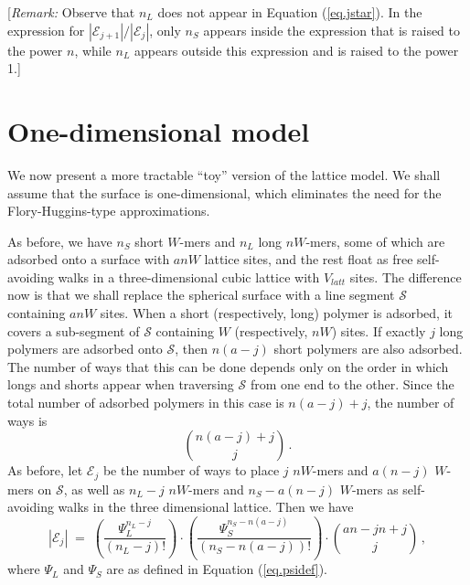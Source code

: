 \documentclass[12pt]{article}
\begin{document}
[\textit{Remark:}  Observe that $n_L$ does not appear in Equation (\ref{eq.jstar}).  
In the expression for $|\mathcal{E}_{j+1}|/|\mathcal{E}_j|$,   only $n_S$ appears inside the 
expression that is raised to the power $n$, while $n_L$ appears outside this expression and is
raised to the power 1.]  



\section{One-dimensional model}

We now present a more tractable ``toy'' version of the lattice model.  We shall assume that 
the surface is one-dimensional, which eliminates the need for the Flory-Huggins-type approximations.

As before, we have $n_S$ short $W$-mers and $n_L$ long $nW$-mers, some of which are adsorbed 
onto a surface with $anW$ lattice sites, and the rest float as free self-avoiding walks 
in a three-dimensional cubic lattice with  $V_{latt}$ sites.  
The difference now is that we shall replace the spherical surface with a line segment
$\mathcal{S}$ containing $anW$ sites.  When a short (respectively, long) polymer is adsorbed, it covers a 
sub-segment of $\mathcal{S}$ containing $W$ (respectively, $nW$) sites.
If exactly $j$ long polymers are adsorbed onto $\mathcal{S}$, then $n(a-j)$ short polymers are
also adsorbed.  The number of ways that this can be done depends only on the order in which 
longs and shorts appear when traversing $\mathcal{S}$ from one end to the other.  Since the total 
number of adsorbed polymers in this case is $n(a-j)+j$, the number of ways is 
\[      \binom{n(a-j)+j}{j}   \,.  \]
As before, let $\mathcal{E}_j$ be the number of ways to place $j$ $nW$-mers and $a(n-j)$ $W$-mers on 
$\mathcal{S}$, as well as $n_L-j$ $nW$-mers and $n_S-a(n-j)$ $W$-mers as self-avoiding walks 
in the three dimensional lattice.  Then we have 
\begin{equation}
   \label{eq.1dE}
    |\mathcal{E}_j| \;=\;  \left(\frac{\Psi_L^{n_{L}-j}}{(n_L-j)!}\right)\cdot\left(\frac{\Psi_S^{n_S-n(a-j)}}{
    (n_S-n(a-j))!}\right) \cdot\binom{an-jn+j}{j}   \,,
\end{equation}
where 
$\Psi_L$ and $\Psi_S$ are as defined in Equation (\ref{eq.psidef}).
\end{document}
